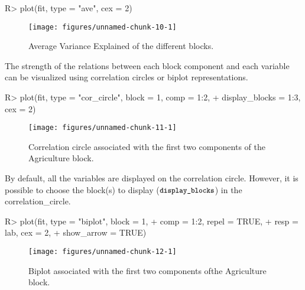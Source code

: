 \documentclass[
]{jss}
\begin{document}
\footnotesize

\begin{CodeChunk}
\begin{CodeInput}
R> plot(fit, type = "ave", cex = 2)
\end{CodeInput}
\begin{figure}[H]

{\centering \texttt{[image: figures/unnamed-chunk-10-1]} 

}

\caption[Average Variance Explained of the different blocks]{Average Variance Explained of the different blocks.}\label{fig:unnamed-chunk-10}
\end{figure}
\end{CodeChunk}

\normalsize

The strength of the relations between each block component and each
variable can be visualized using correlation circles or biplot
representations.

\footnotesize

\begin{CodeChunk}
\begin{CodeInput}
R> plot(fit, type = "cor_circle", block = 1, comp = 1:2, 
+      display_blocks = 1:3, cex = 2)
\end{CodeInput}
\begin{figure}[H]

{\centering \texttt{[image: figures/unnamed-chunk-11-1]} 

}

\caption[Correlation circle associated with the first two components of the Agriculture block]{Correlation circle associated with the first two components of the Agriculture block.}\label{fig:unnamed-chunk-11}
\end{figure}
\end{CodeChunk}

\normalsize

By default, all the variables are displayed on the correlation circle.
However, it is possible to choose the block(s) to display
(\(\small{\texttt{display\_blocks}}\)) in the correlation\_circle.

\footnotesize

\begin{CodeChunk}
\begin{CodeInput}
R> plot(fit, type = "biplot", block = 1, 
+      comp = 1:2, repel = TRUE, 
+      resp = lab, cex = 2,
+      show_arrow = TRUE)
\end{CodeInput}
\begin{figure}[H]

{\centering \texttt{[image: figures/unnamed-chunk-12-1]} 

}

\caption[Biplot associated with the first two components ofthe Agriculture block]{Biplot associated with the first two components ofthe Agriculture block.}\label{fig:unnamed-chunk-12}
\end{figure}
\end{CodeChunk}
\end{document}
